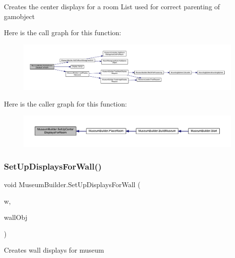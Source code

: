 Creates the center displays for a room List used for correct parenting of gamobject 

Here is the call graph for this function\+:
\nopagebreak
\begin{figure}[H]
\begin{center}
\leavevmode
\includegraphics[width=350pt]{class_museum_builder_a159e037415aaf348d5a0af9561be8560_cgraph}
\end{center}
\end{figure}
Here is the caller graph for this function\+:
\nopagebreak
\begin{figure}[H]
\begin{center}
\leavevmode
\includegraphics[width=350pt]{class_museum_builder_a159e037415aaf348d5a0af9561be8560_icgraph}
\end{center}
\end{figure}
\mbox{\label{class_museum_builder_adbfb12c00a855fe0f816bc18a51a72e5}} 
\subsubsection{\texorpdfstring{Set\+Up\+Displays\+For\+Wall()}{SetUpDisplaysForWall()}}
{\footnotesize\ttfamily void Museum\+Builder.\+Set\+Up\+Displays\+For\+Wall (\begin{DoxyParamCaption}\item[{\mbox{\hyperlink{class_wall}{Wall}}}]{w,  }\item[{Game\+Object}]{wall\+Obj }\end{DoxyParamCaption})\hspace{0.3cm}{\ttfamily [private]}}



Creates wall displays for museum 

